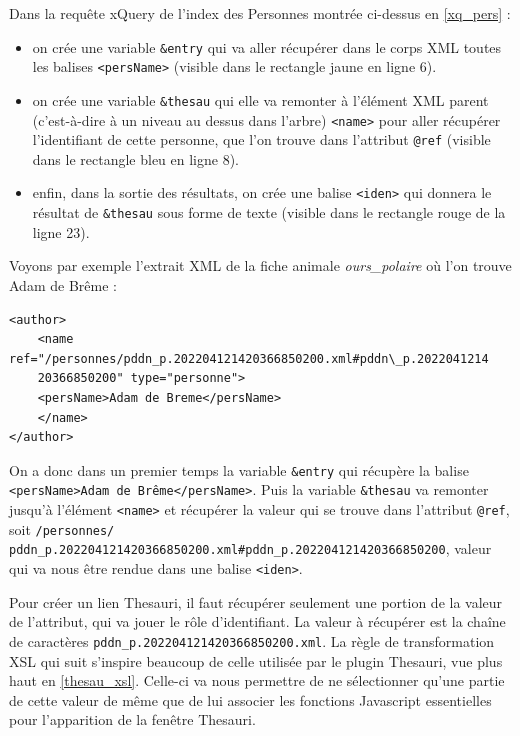 \documentclass[a4paper,12pt,twoside]{book}
\begin{document}
Dans la requête xQuery de l'index des Personnes montrée ci-dessus en \ref{xq_pers} :
\begin{itemize}
    \item on crée une variable \texttt{\&entry} qui va aller récupérer dans le corps XML toutes les balises \texttt{<persName>} (visible dans le rectangle jaune en ligne 6).
    \item on crée une variable \texttt{\&thesau} qui elle va remonter à l'élément XML parent (c'est-à-dire à un niveau au dessus dans l'arbre) \texttt{<name>} pour aller récupérer l'identifiant de cette personne, que l'on trouve dans l'attribut \texttt{@ref} (visible dans le rectangle bleu en ligne 8).
    \item enfin, dans la sortie des résultats, on crée une balise \texttt{<iden>} qui donnera le résultat de \texttt{\&thesau} sous forme de texte (visible dans le rectangle rouge de la ligne 23).
\end{itemize}


Voyons par exemple l'extrait XML de la fiche animale \textit{ours\_polaire} où l'on trouve Adam de Brême :\\


\begin{verbatim}
<author>
    <name ref="/personnes/pddn_p.202204121420366850200.xml#pddn\_p.2022041214
    20366850200" type="personne">
    <persName>Adam de Breme</persName>
    </name>
</author>
\end{verbatim}

On a donc dans un premier temps la variable \texttt{\&entry} qui récupère la balise\\ \texttt{<persName>Adam de Brême</persName>}. Puis la variable \texttt{\&thesau} va remonter jusqu'à l'élément \texttt{<name>} et récupérer la valeur qui se trouve dans l'attribut \texttt{@ref}, soit  \og \texttt{/personnes/\\pddn\_p.202204121420366850200.xml\#pddn\_p.202204121420366850200}\fg, valeur qui va nous être rendue dans une balise \texttt{<iden>}.



Pour créer un lien Thesauri, il faut récupérer seulement une portion de la valeur de l'attribut, qui va jouer le rôle d'identifiant. La valeur à récupérer est la chaîne de caractères \texttt{pddn\_p.202204121420366850200.xml}. La règle de transformation \acrshort{XSL} qui suit s'inspire beaucoup de celle utilisée par le plugin Thesauri, vue plus haut en \ref{thesau_xsl}. Celle-ci va nous permettre de ne sélectionner qu'une partie de cette valeur de même que de lui associer les fonctions Javascript essentielles pour l'apparition de la fenêtre Thesauri.
\end{document}
